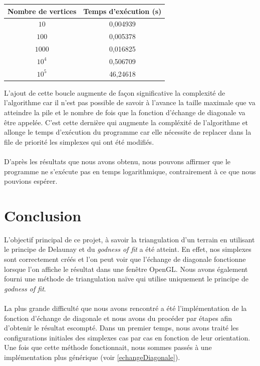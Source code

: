 \documentclass{article}
\begin{document}
        \begin{center}
            \begin{tabular}{|c|c|}\hline \label{tempsDelaunay}
                Nombre de vertices & Temps d'exécution (s) \\
                \hline
                $10$ &  0,004939 \\
                $100$ & 0,005378 \\
                $1000$ & 0,016825 \\
                $10^4$ & 0,506709 \\
                $10^5$ & 46,24618 \\
                \hline
            \end{tabular}
        \end{center}
        
        L'ajout de cette boucle augmente de façon significative la complexité de l'algorithme car il n'est pas possible de savoir à l'avance la taille maximale que va atteindre la pile et le nombre de fois que la fonction d'échange de diagonale va être appelée. C'est cette dernière qui augmente la compléxité de l'algorithme et allonge le temps d'exécution du programme car elle nécessite de replacer dans la file de priorité les simplexes qui ont été modifiés. 
        \paragraph{}
        D'après les résultats que nous avons obtenu, nous pouvons affirmer que le programme ne s'exécute pas en temps logarithmique, contrairement à ce que nous pouvions espérer.


\section{Conclusion}    

    L'objectif principal de ce projet, à savoir la triangulation d'un terrain en utilisant le principe de Delaunay et du \textit{godness of fit} a été atteint. En effet, nos simplexes sont correctement créés et l'on peut voir que l'échange de diagonale fonctionne lorsque l'on affiche le résultat dans une fenêtre OpenGL. Nous avons également fourni une méthode de triangulation naïve qui utilise uniquement le principe de \textit{godness of fit}.
    
    \paragraph{}
    La plus grande difficulté que nous avons rencontré a été l'implémentation de la fonction d'échange de diagonale et nous avons du procéder par étapes afin d'obtenir le résultat escompté. Dans un premier temps, nous avons traité les configurations initiales des simplexes cas par cas en fonction de leur orientation. Une fois que cette méthode fonctionnait, nous sommes passés à une implémentation plus générique (voir \ref{echangeDiagonale}).
\end{document}
